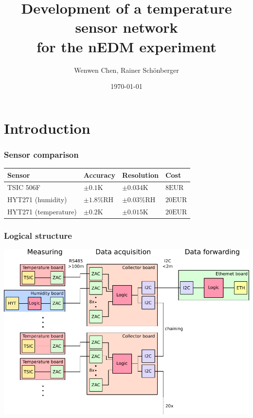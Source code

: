 \documentclass[t]{beamer}
\title{Development of a temperature sensor network\\for the nEDM experiment}
\author{Wenwen Chen, Rainer Schönberger}
\date{\today}
\begin{document}
\begin{frame}
    \titlepage
\end{frame}




\section{Introduction}
\begin{frame}[c]
    \frametitle{Sensor comparison}
\begin{tabular}{ M M M M}
	Sensor & Accuracy & Resolution & Cost\tabularnewline
	\hline
	\hline
	TSIC 506F& $\pm 0.1\mathrm{K}$ & $\pm 0.034\mathrm{K}$ & $8 \mathrm{EUR}$\tabularnewline
	\hline
	HYT271 (humidity)& $\pm 1.8\mathrm{\%RH}$ & $\pm 0.03\mathrm{\%RH}$ & $20 \mathrm{EUR}$\tabularnewline
	HYT271 (temperature)& $\pm 0.2\mathrm{K}$ & $\pm 0.015\mathrm{K}$ & $20 \mathrm{EUR}$\tabularnewline
	\hline
\end{tabular}
\end{frame}
\begin{frame}[c]
\end{frame}
\begin{frame}[c]
    \frametitle{Logical structure}
  \begin{center}
  	\includegraphics[width=0.9\linewidth]{img/plan2_color.pdf}\\
  \vspace{0.5cm}
  \end{center}
    
\end{frame}
\end{document}
